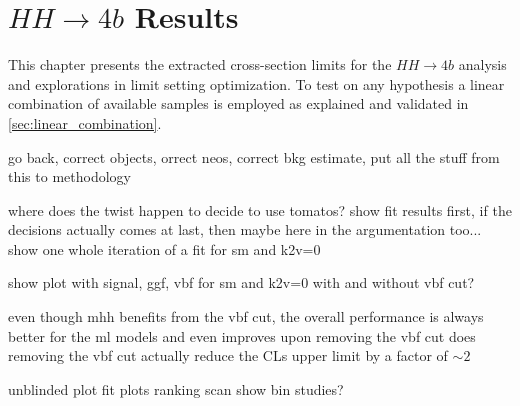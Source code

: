 \chapter{$HH\rightarrow 4b$ Results}\label{ch:hh4b-results}


This chapter presents the extracted cross-section limits for the $HH\rightarrow 4b$ analysis and explorations in limit setting optimization. To test on any \ktwov hypothesis a linear combination of available samples is employed as explained and validated in \ref{sec:linear_combination}.




\begin{landscape}
    \begin{figure}
        \centering
        \caption[]{}
        \label{fig:k2v_scan_limits_overlay}
    \end{figure}
\end{landscape}


go back, correct objects,  orrect neos, correct bkg estimate, put all the stuff from this to methodology



where does the twist happen to decide to use tomatos? show fit results first, if the decisions actually comes at last, then maybe here in the argumentation too...
show one whole iteration of a fit for sm and k2v=0

show plot with signal, ggf, vbf for sm and k2v=0 with and without vbf cut?

even though mhh benefits from the vbf cut, the overall performance is always better for the \ac{ml} models and even improves upon removing the vbf cut
does removing the vbf cut actually reduce the CLs upper limit by a factor of $\sim 2$

unblinded plot
fit plots
ranking
scan
show bin studies?

